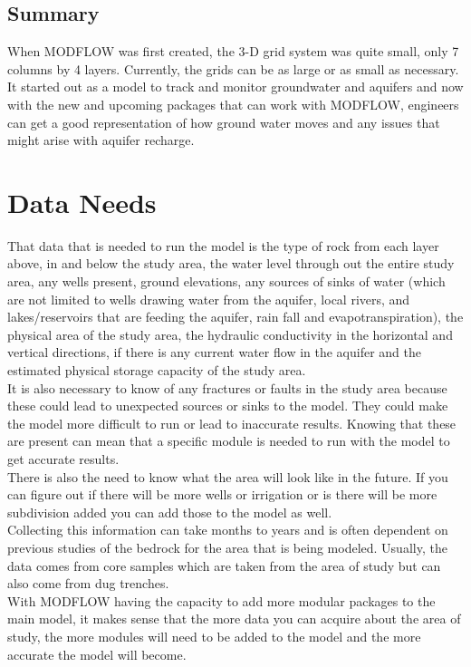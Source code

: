 \documentclass[]{report}
\begin{document}
\section{Summary}
When MODFLOW was first created, the 3-D grid system was quite small, only 7 columns by 4 layers. Currently, the grids can be as large or as small as necessary. It started out as a model to track and monitor groundwater and aquifers and now with the new and upcoming packages that can work with MODFLOW, engineers can get a good representation of how ground water moves and any issues that might arise with aquifer recharge. \\




\chapter{Data Needs}

That data that is needed to run the model is the type of rock from each layer above, in and below the study area, the water level through out the entire study area, any wells present, ground elevations, any sources of sinks of water (which are not limited to wells drawing water from the aquifer, local rivers, and lakes/reservoirs that are feeding the aquifer, rain fall and evapotranspiration), the physical area of the study area, the hydraulic conductivity in the horizontal and vertical directions, if there is any current water flow in the aquifer and the estimated physical storage capacity of the study area. \\
It is also necessary to know of any fractures or faults in the study area because these could lead to unexpected sources or sinks to the model. They could make the model more difficult to run or lead to inaccurate results. Knowing that these are present can mean that a specific module is needed to run with the model to get accurate results. \\
There is also the need to know what the area will look like in the future. If you can figure out if there will be more wells or irrigation or is there will be more subdivision added you can add those to the model as well. \\
Collecting this information can take months to years and is often dependent on previous studies of the bedrock for the area that is being modeled. Usually, the data comes from core samples which are taken from the area of study but can also come from dug trenches. \\
With MODFLOW having the capacity to add more modular packages to the main model, it makes sense that the more data you can acquire about the area of study, the more modules will need to be added to the model and the more accurate the model will become. 
\end{document}
